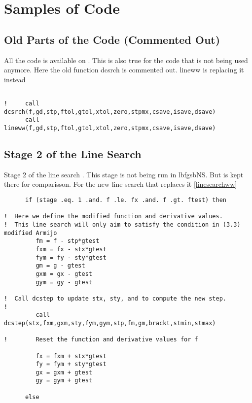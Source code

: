 
\chapter{Samples of Code} %

\label{AppendixA} %


\section{Old Parts of the Code (Commented Out)}
All the code is available on \citep{lbfgsbNS} \label{ignoredcode}. This is also true for the code that is not being used anymore.  Here the old function dcsrch is commented out. lineww is replacing it instead
\begin{lstlisting}

!     call dcsrch(f,gd,stp,ftol,gtol,xtol,zero,stpmx,csave,isave,dsave)
      call lineww(f,gd,stp,ftol,gtol,xtol,zero,stpmx,csave,isave,dsave)

\end{lstlisting}

\section{Stage 2 of the Line Search}
Stage 2 of the line search\citep{lbfgsbsoftware} \label{stage2}. This stage is not being run in lbfgsbNS. But is kept there for comparisson. For the new line search that replaces it \ref{linesearchww}
\begin{lstlisting}
      if (stage .eq. 1 .and. f .le. fx .and. f .gt. ftest) then

!  Here we define the modified function and derivative values.
!  This line search will only aim to satisfy the condition in (3.3) modified Armijo
         fm = f - stp*gtest
         fxm = fx - stx*gtest
         fym = fy - sty*gtest
         gm = g - gtest
         gxm = gx - gtest
         gym = gy - gtest

!  Call dcstep to update stx, sty, and to compute the new step.
!
         call dcstep(stx,fxm,gxm,sty,fym,gym,stp,fm,gm,brackt,stmin,stmax)

!        Reset the function and derivative values for f

         fx = fxm + stx*gtest
         fy = fym + sty*gtest
         gx = gxm + gtest
         gy = gym + gtest

      else
\end{lstlisting}

